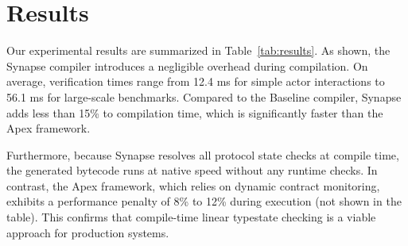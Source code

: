 \section{Results}
Our experimental results are summarized in Table~\ref{tab:results}. As shown, the Synapse compiler introduces a negligible overhead during compilation. On average, verification times range from 12.4 ms for simple actor interactions to 56.1 ms for large-scale benchmarks. Compared to the Baseline compiler, Synapse adds less than 15\% to compilation time, which is significantly faster than the Apex framework.

Furthermore, because Synapse resolves all protocol state checks at compile time, the generated bytecode runs at native speed without any runtime checks. In contrast, the Apex framework, which relies on dynamic contract monitoring, exhibits a performance penalty of 8\% to 12\% during execution (not shown in the table). This confirms that compile-time linear typestate checking is a viable approach for production systems.

\begin{table}[t]
\centering
\caption{Performance and verification metrics across different compiler configurations on three benchmark suites.}
\label{tab:results}
\end{table}
